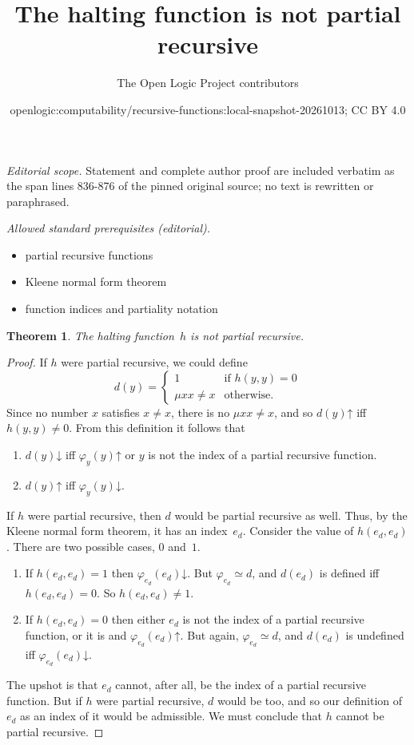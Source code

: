 \documentclass[10pt,a4paper]{article}
\title{The halting function is not partial recursive}
\author{The Open Logic Project contributors}
\date{openlogic:computability/recursive-functions:local-snapshot-20261013; CC BY 4.0}
\theoremstyle{plain}
\newtheorem{thm}{Theorem}[section]
\theoremstyle{definition}
\theoremstyle{remark}
\newcommand*{\ollabel}[1]{\label{#1}}
\providecommand{\cfind}[1]{\varphi_{#1}}
\providecommand{\fdefined}{\mathord{\downarrow}}
\providecommand{\umin}{\mu}
\providecommand{\fundefined}{\mathord{\uparrow}}
\begin{document}
\maketitle
\noindent\textit{Editorial scope.} Statement and complete author proof are included verbatim as the span lines 836-876 of the pinned original source; no text is rewritten or paraphrased.\par\medskip
\noindent\textit{Allowed standard prerequisites (editorial).}\begin{itemize}
\item partial recursive functions
\item Kleene normal form theorem
\item function indices and partiality notation
\end{itemize}\medskip
\begin{thm}
\ollabel{thm:halting-problem}
The halting function~$h$ is not partial recursive.
\end{thm}

\begin{proof}
If $h$
were partial recursive, we could define
\[
d(y) =
\begin{cases}
1 & \text{if $h(y, y) = 0$}\\
\umin{x}{x \neq x} & \text{otherwise.}
\end{cases}
\]
Since no number $x$ satisfies $x \neq x$, there is no $\umin{x}{x \neq
x}$, and so $d(y) \fundefined$ iff $h(y,y) \neq 0$. From this
definition it follows that
\begin{enumerate}
\item $d(y) \fdefined$ iff $\cfind{y}(y) \fundefined$ or $y$ is
  not the index of a partial recursive function.
\item $d(y) \fundefined$ iff $\cfind{y}(y) \fdefined$.
\end{enumerate}
If $h$ were partial recursive, then $d$ would be partial recursive as
well.  Thus, by the Kleene normal form theorem, it has an index~$e_d$.
Consider the value of $h(e_d, e_d)$. There are two possible cases, $0$
and~$1$.
\begin{enumerate}
\item If $h(e_d, e_d) = 1$ then $\cfind{e_d}(e_d) \fdefined$.  But
  $\cfind{e_d} \simeq d$, and $d(e_d)$ is defined iff $h(e_d, e_d) = 0$.
  So $h(e_d, e_d) \neq 1$.
\item If $h(e_d, e_d) = 0$ then either $e_d$ is not the index of a
  partial recursive function, or it is and $\cfind{e_d}(e_d)
  \fundefined$. But again, $\cfind{e_d} \simeq d$, and $d(e_d)$ is undefined
  iff $\cfind{e_d}(e_d) \fdefined$.
\end{enumerate}
The upshot is that $e_d$ cannot, after all, be the index of a partial
recursive function.  But if $h$ were partial recursive, $d$ would be
too, and so our definition of $e_d$ as an index of it would be
admissible.  We must conclude that $h$ cannot be partial recursive.
\end{proof}
\end{document}
